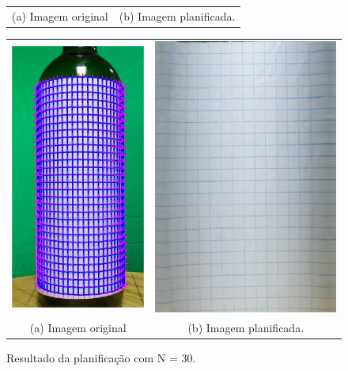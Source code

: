 \begin{figure}[ht]
\begin{minipage}{.5\textwidth}
\begin{tabular}{cc}
            \\
            (a) Imagem original & (b) Imagem planificada.
            \end{tabular}
	\end{minipage}
    \label{fig:ensaio_2_2020a}
\end{figure}

\begin{figure}[ht]
    \caption{Resultado da planificação com N = 30.}     
    \centering
    \vspace{0.3cm}
    \begin{minipage}{.5\textwidth}
      \centering
            \begin{tabular}{cc}
            \includegraphics[width=.4\linewidth]{TCC/Imagens/ensaios/a_3030.jpg} 
            &
            \includegraphics[width=.55\linewidth]{TCC/Imagens/ensaios/b_3030.png}
            \\
            (a) Imagem original & (b) Imagem planificada.
            \end{tabular}
	\end{minipage}
    \label{fig:ensaio_2_3030a}
\end{figure}


